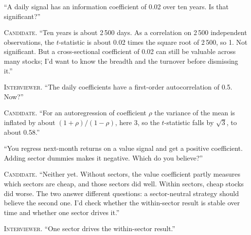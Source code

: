 \begin{interviewq}\label{iq:iv:mock-interviews:4}
``A daily signal has an information coefficient of 0.02 over ten years. Is that significant?''
\end{interviewq}

\noindent\textsc{Candidate.} ``Ten years is about 2\,500 days. As a correlation on 2\,500 independent observations, the $t$-statistic
is about 0.02 times the square root of 2\,500, so 1. Not significant. But a cross-sectional coefficient of 0.02 can still be
valuable across many stocks; I'd want to know the breadth and the turnover before dismissing it.''


\noindent\textsc{Interviewer.} ``The daily coefficients have a first-order autocorrelation of 0.5. Now?''

\noindent\textsc{Candidate.} ``For an autoregression of coefficient $\rho$ the variance of the mean is inflated by about $(1 + \rho)/(1 -
\rho)$, here 3, so the $t$-statistic falls by $\sqrt3$, to about 0.58.''


\begin{interviewq}\label{iq:iv:mock-interviews:5}
``You regress next-month returns on a value signal and get a positive coefficient. Adding sector dummies makes it negative. Which do
you believe?''
\end{interviewq}

\noindent\textsc{Candidate.} ``Neither yet. Without sectors, the value coefficient partly measures which sectors are cheap, and
those sectors did well. Within sectors, cheap stocks did worse. The two answer different questions: a sector-neutral strategy should
believe the second one. I'd check whether the within-sector result is stable over time and whether one sector drives it.''


\noindent\textsc{Interviewer.} ``One sector drives the within-sector result.''

